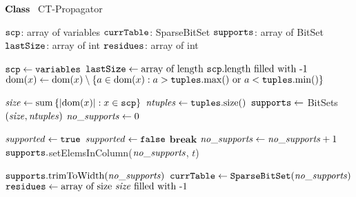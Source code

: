 \STATE $\textbf{Class~}$ CT-Propagator
    \item[]
      \STATE $\texttt{scp}$: array of variables
      \STATE $\texttt{currTable}$: SparseBitSet 
      \STATE $\texttt{supports}$: array of BitSet   
      \STATE $\texttt{lastSize}$: array of int 
      \STATE $\texttt{residues}$: array of int  
            
    \item[]
      \STATE $\texttt{scp} \leftarrow \texttt{variables}$
      \STATE $\texttt{lastSize} \leftarrow \text{array of  length~} \texttt{scp}.\mathrm{length}
      ~\text{filled with -1}$ 
        \STATE $\text{dom}({x}) \leftarrow \text{dom}({x}) \setminus  
        \left\{a \in \text{dom}({x}) : a > \texttt{tuples}.\mathrm{max}()
          ~\text{or}~a < \texttt{tuples}.\mathrm{min}()\right\}$
      \ENDFOREACH

      \STATE $\mathit{size} \leftarrow \mathrm{sum}\left\{|\text{dom}({x})| : x \in \texttt{scp}\right\}$
      \STATE $\mathit{ntuples} \leftarrow \texttt{tuples}.\mathrm{size}()$ 
      \STATE $\texttt{supports} \leftarrow$ BitSets$(\mathit{size}, \mathit{ntuples})$
      \STATE $\mathit{no\_supports} \leftarrow 0$
      
        \STATE $\mathit{supported} \leftarrow \texttt{true}$
            \STATE $\mathit{supported} \leftarrow \texttt{false}$
            \STATE $\textbf{break}$ 
          \ENDIF
        \ENDFOREACH
            \STATE $\mathit{no\_supports} \leftarrow \mathit{no\_supports} + 1$
            \STATE $\texttt{supports}.$setElemsInColumn($\mathit{no\_supports}$, $t$) 
          \ENDIF
      \ENDFOREACH

      \STATE $\texttt{supports}.\text{trimToWidth}(\mathit{no\_supports})$ 
      \STATE $\texttt{currTable} \leftarrow \texttt{SparseBitSet}(\mathit{no\_supports})$ 
      \STATE $\texttt{residues} \leftarrow \text{array of size~} \mathit{size} 
      \text{~filled with -1}$ 
      \Endfunc

